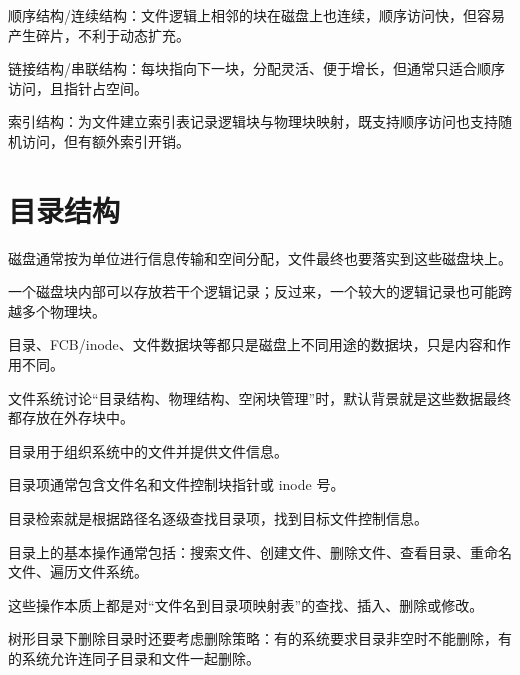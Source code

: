 \begin{points}
  \item 顺序结构/连续结构：文件逻辑上相邻的块在磁盘上也连续，顺序访问快，但容易产生碎片，不利于动态扩充。
  \item 链接结构/串联结构：每块指向下一块，分配灵活、便于增长，但通常只适合顺序访问，且指针占空间。
  \item 索引结构：为文件建立索引表记录逻辑块与物理块映射，既支持顺序访问也支持随机访问，但有额外索引开销。
\end{points}


\section{目录结构}
\begin{points}
  \item 磁盘通常按为单位进行信息传输和空间分配，文件最终也要落实到这些磁盘块上。
  \item 一个磁盘块内部可以存放若干个逻辑记录；反过来，一个较大的逻辑记录也可能跨越多个物理块。
  \item 目录、FCB/inode、文件数据块等都只是磁盘上不同用途的数据块，只是内容和作用不同。
  \item 文件系统讨论“目录结构、物理结构、空闲块管理”时，默认背景就是这些数据最终都存放在外存块中。
\end{points}

\begin{points}
  \item 目录用于组织系统中的文件并提供文件信息。
  \item 目录项通常包含文件名和文件控制块指针或 inode 号。
  \item 目录检索就是根据路径名逐级查找目录项，找到目标文件控制信息。
\end{points}


\begin{points}
  \item 目录上的基本操作通常包括：搜索文件、创建文件、删除文件、查看目录、重命名文件、遍历文件系统。
  \item 这些操作本质上都是对“文件名到目录项映射表”的查找、插入、删除或修改。
  \item 树形目录下删除目录时还要考虑删除策略：有的系统要求目录非空时不能删除，有的系统允许连同子目录和文件一起删除。
\end{points}


